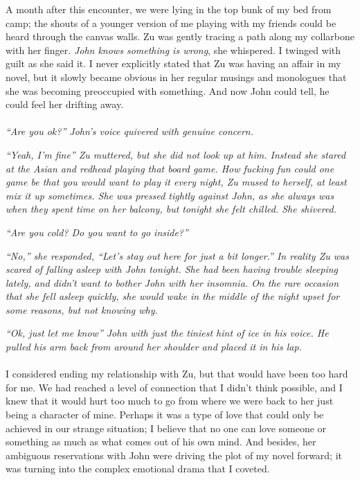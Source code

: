 \documentclass[12pt,oneside,openany]{memoir}
\begin{document}
	A month after this encounter, we were lying in the top bunk of my bed from camp; the shouts of a younger version of me playing with my friends could be heard through the canvas walls. Zu was gently tracing a path along my collarbone with her finger. \textit{John knows something is wrong}, she whispered. I twinged with guilt as she said it. I never explicitly stated that Zu was having an affair in my novel, but it slowly became obvious in her regular musings and monologues that she was becoming preoccupied with something. And now John could tell, he could feel her drifting away.
\\\\	
\indent\textit{	“Are you ok?” John's voice quivered with genuine concern.}
	
\textit{	“Yeah, I’m fine” Zu muttered, but she did not look up at him. Instead she stared at the Asian and redhead playing that board game. How fucking fun could one game be that you would want to play it every night, Zu mused to herself, at least mix it up sometimes. She was pressed tightly against John, as she always was when they spent time on her balcony, but tonight she felt chilled. She shivered.}
	
\textit{	“Are you cold? Do you want to go inside?”}
	
\textit{	“No,” she responded, “Let’s stay out here for just a bit longer.” In reality Zu was scared of falling asleep with John tonight. She had been having trouble sleeping lately, and didn’t want to bother John with her insomnia. On the rare occasion that she fell asleep quickly, she would wake in the middle of the night upset for some reasons, but not knowing why. }
	
\textit{	“Ok, just let me know” John with just the tiniest hint of ice in his voice. He pulled his arm back from around her shoulder and placed it in his lap.}
\\\\	
\indent I considered ending my relationship with Zu, but that would have been too hard for me. We had reached a level of connection that I didn’t think possible, and I knew that it would hurt too much to go from where we were back to her just being a character of mine. Perhaps it was a type of love that could only be achieved in our strange situation; I believe that no one can love someone or something as much as what comes out of his own mind. And besides, her ambiguous reservations with John were driving the plot of my novel forward; it was turning into the complex emotional drama that I coveted.
	
\end{document}
